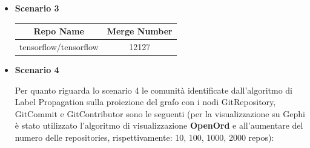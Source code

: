 \documentclass[11pt]{article}
\begin{document}
\begin{itemize}
    \item \textbf{Scenario 3}

    \begin{table}[!ht]
        \centering
        \begin{tabular}{cc}
        \toprule
        Repo Name & Merge Number \\
        \midrule
            tensorflow/tensorflow & 12127 \\
        \bottomrule
        \end{tabular}
    \end{table}

    \newpage
    \item \textbf{Scenario 4}

Per quanto riguarda lo scenario 4 le comunità identificate dall'algoritmo di Label Propagation sulla proiezione del grafo con i nodi GitRepository, GitCommit e GitContributor sono le seguenti (per la visualizzazione su Gephi è stato utilizzato l'algoritmo di visualizzazione \textbf{OpenOrd} e all'aumentare del numero delle repositories, rispettivamente: 10, 100, 1000, 2000 repos):


\end{itemize}
\end{document}
